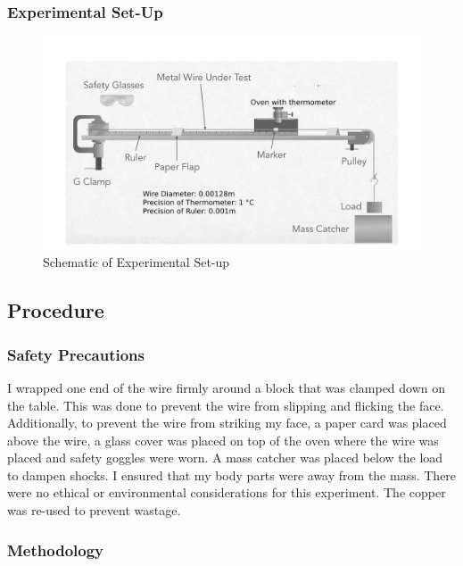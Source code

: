 \documentclass{article}
\begin{document}
\subsubsection{Experimental Set-Up}
\begin{figure}[!h]
    \centering
    \caption{Schematic of Experimental Set-up}
    \includegraphics[width=12cm]{imageonline-co-blackandwhiteimage (1).jpg} 
\end{figure}
\FloatBarrier

\subsection{Procedure}

\subsubsection{Safety Precautions}

\par{I wrapped one end of the wire firmly around a block that was clamped down on the table. This was done to prevent the wire from slipping and flicking the face. Additionally, to prevent the wire from striking my face, a paper card was placed above the wire, a glass cover was placed on top of the oven where the wire was placed and safety goggles were worn. A mass catcher was placed below the load to dampen shocks. I ensured that my body parts were away from the mass. There were no ethical or environmental considerations for this experiment. The copper was re-used to prevent wastage.}
\vspace{-0.5cm}
\subsubsection{Methodology}
\end{document}
